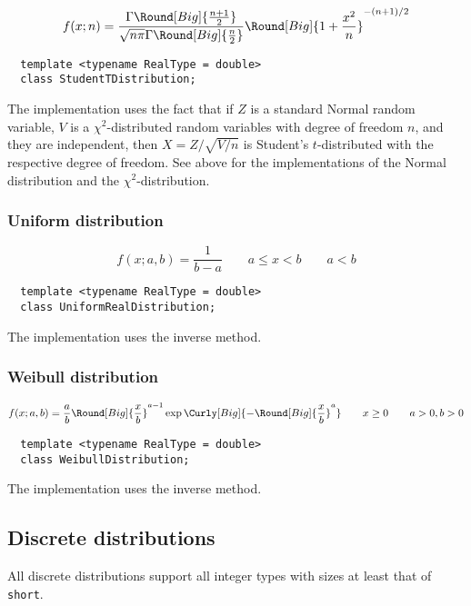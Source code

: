 \begin{equation*}
  f(x;n) = \frac{\Gamma\Round[Big]{\frac{n + 1}{2}}}{
    \sqrt{n\pi}\Gamma\Round[Big]{\frac{n}{2}}}
  \Round[Big]{1 + \frac{x^2}{n}}^{-(n + 1)/2}
\end{equation*}
\begin{Verbatim}
  template <typename RealType = double>
  class StudentTDistribution;
\end{Verbatim}
The implementation uses the fact that if $Z$ is a standard Normal random
variable, $V$ is a $\chi^2$-distributed random variables with degree of freedom
$n$, and they are independent, then $X = Z / \sqrt{V / n}$ is Student's
$t$-distributed with the respective degree of freedom. See above for the
implementations of the Normal distribution and the $\chi^2$-distribution.

\subsubsection{Uniform distribution}

\begin{equation*}
  f(x;a,b) = \frac{1}{b - a}
  \qquad a \le x < b
  \qquad a < b
\end{equation*}
\begin{Verbatim}
  template <typename RealType = double>
  class UniformRealDistribution;
\end{Verbatim}
The implementation uses the inverse method.

\subsubsection{Weibull distribution}

\begin{equation*}
  f(x;a,b) = \frac{a}{b}\Round[Big]{\frac{x}{b}}^{a - 1}
  \exp\Curly[Big]{-\Round[Big]{\frac{x}{b}}^a}
  \qquad x \ge 0
  \qquad a > 0, b > 0
\end{equation*}
\begin{Verbatim}
  template <typename RealType = double>
  class WeibullDistribution;
\end{Verbatim}
The implementation uses the inverse method.

\subsection{Discrete distributions}
\label{sub:Discrete distributions}

All discrete distributions support all integer types with sizes at least that
of \verb|short|.

